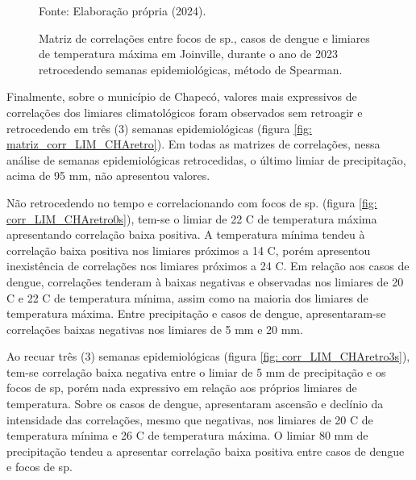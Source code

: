 \begin{figure}[htbp]
    \begin{center}
    \caption{Matriz de correlações entre focos de  sp., casos de dengue e limiares de temperatura máxima em Joinville, durante o ano de 2023 retrocedendo semanas epidemiológicas, método de Spearman.}
    \label{fig: matriz_corr_LIM_JOItmax}
        \hfill
    \end{center}
    \small{Fonte: Elaboração própria (2024).}
\end{figure}


Finalmente, sobre o município de Chapecó, valores mais expressivos de correlações dos limiares climatológicos foram observados sem retroagir e retrocedendo em três (3) semanas epidemiológicas (figura \ref{fig: matriz_corr_LIM_CHAretro}). Em todas as matrizes de correlações, nessa análise de semanas epidemiológicas retrocedidas, o último limiar de precipitação, acima de 95 mm, não apresentou valores.

\indent Não retrocedendo no tempo e correlacionando com focos de  sp. (figura \ref{fig: corr_LIM_CHAretro0s}), tem-se o limiar de 22 C de temperatura máxima apresentando correlação baixa positiva. A temperatura mínima tendeu à correlação baixa positiva nos limiares próximos a 14 C, porém apresentou inexistência de correlações nos limiares próximos a 24 C. Em relação aos casos de dengue, correlações tenderam à baixas negativas e observadas nos limiares de 20 C e 22 C de temperatura mínima, assim como na maioria dos limiares de temperatura máxima. Entre precipitação e casos de dengue, apresentaram-se correlações baixas negativas nos limiares de 5 mm e 20 mm. 

\indent Ao recuar três (3) semanas epidemiológicas (figura \ref{fig: corr_LIM_CHAretro3s}), tem-se correlação baixa negativa entre o limiar de 5 mm de precipitação e os focos de  sp, porém nada expressivo em relação aos próprios limiares de temperatura. Sobre os casos de dengue, apresentaram ascensão e declínio da intensidade das correlações, mesmo que negativas, nos limiares de 20 C de temperatura mínima e 26 C de temperatura máxima. O limiar 80 mm de precipitação tendeu a apresentar correlação baixa positiva entre casos de dengue e focos de  sp.

